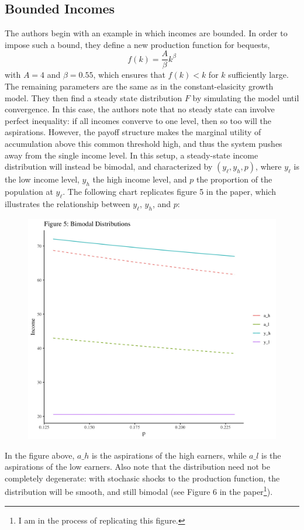 \documentclass[11pt]{article}
\begin{document}
    \subsection{Bounded Incomes}
    The authors begin with an example in which incomes are bounded. In order to impose such a bound, they define a new production function for bequests,
    \[f(k) = \frac{A}{\beta}k^\beta\]
    with \( A = 4 \) and \( \beta = 0.55 \), which ensures that \( f(k) < k \) for \( k \) sufficiently large. The remaining parameters are the same as in the constant-elasicity growth model. They then find a steady state distribution \( F \) by simulating the model until convergence. In this case, the authors note that no steady state can involve perfect inequality: if all incomes converve to one level, then so too will the aspirations. However, the payoff structure makes the marginal utility of accumulation above this common threshold high, and thus the system pushes away from the single income level. In this setup, a steady-state income distribution will instead be bimodal, and characterized by \( (y_\ell, y_h, p) \), where \( y_\ell \) is the low income level, \( y_h \) the high income level, and \( p \) the proportion of the population at \( y_\ell \). The following chart replicates figure 5 in the paper, which illustrates the relationship between \( y_\ell \), \( y_h \), and \( p \):
    \begin{figure}[!ht]
        \centering
        \includegraphics[scale = 0.14]{figures/fig5.jpg}
    \end{figure}
    \newpage
    In the figure above, \( a\_h \) is the aspirations of the high earners, while \( a\_l \) is the aspirations of the low earners. Also note that the distribution need not be completely degenerate: with stochasic shocks to the production function, the distribution will be smooth, and still bimodal (see Figure 6 in the paper\footnote{I am in the process of replicating this figure.}). 
\end{document}
